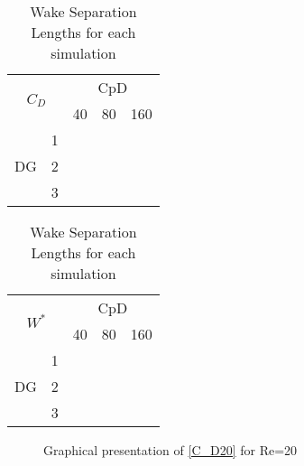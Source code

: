 \begin{table}[htp]
	\centering
	\def\arraystretch{1.5}
	\begin{minipage}[b]{0.3\textwidth}	
			\begin{tabular}{|c|c|c|c|c|}
				\hline
				\multicolumn{2}{|c|}{\multirow{2}{*}{$C_D$}} & \multicolumn{3}{c|}{CpD} \\ \cline{3-5} 
				\multicolumn{2}{|c|}{}                       & 40     & 80    & 160    \\ \hline
				\multirow{3}{*}{DG}            & 1           &        &       &        \\ \cline{2-5} 
				& 2           &        &       &        \\ \cline{2-5} 
				& 3           &        &       &        \\ \hline
			\end{tabular}
			\caption[$C_D$ Values for each simulation]{$C_D$ Values for each simulation \newline}	
			\label{C_D20}
	\end{minipage}
	\centering
	\quad
	\begin{minipage}[b]{0.3\textwidth}	
		\begin{tabular}{|c|c|c|c|c|}
			\hline
			\multicolumn{2}{|c|}{\multirow{2}{*}{$W^*$}} & \multicolumn{3}{c|}{CpD} \\ \cline{3-5} 
			\multicolumn{2}{|c|}{}                       & 40     & 80    & 160    \\ \hline
			\multirow{3}{*}{DG}            & 1           &        &       &        \\ \cline{2-5} 
			& 2           &        &       &        \\ \cline{2-5} 
			& 3           &        &       &        \\ \hline
		\end{tabular}
		\caption{Wake Separation Lengths for each simulation}	
		\label{W20}
	\end{minipage}
\end{table}

	\begin{figure}[htp]	
		\centering
		\caption{Graphical presentation of \cref{C_D20} for Re=20}
		\label{shivfjftersaror}	
	\end{figure}
	

